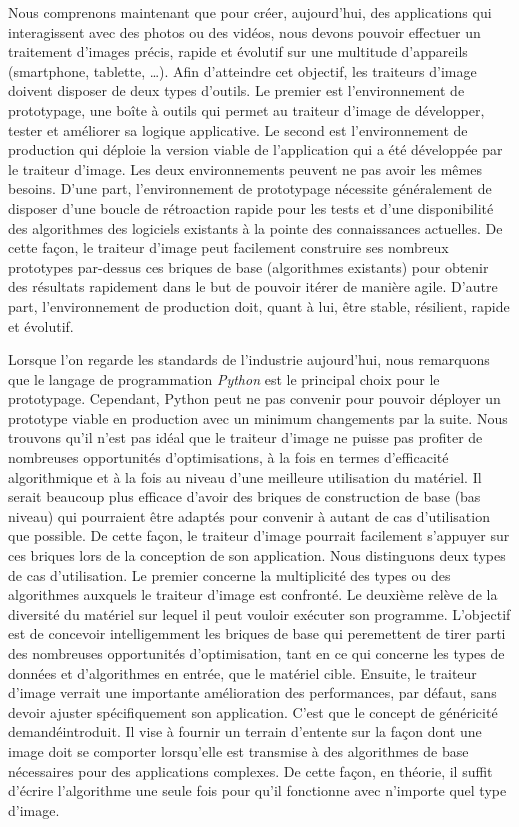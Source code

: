 Nous comprenons maintenant que pour créer, aujourd'hui, des applications qui interagissent avec des photos ou des
vidéos, nous devons pouvoir effectuer un traitement d'images précis, rapide et évolutif sur une multitude d'appareils
(smartphone, tablette, \ldots). Afin d'atteindre cet objectif, les traiteurs d'image doivent disposer de deux types
d'outils. Le premier est l'environnement de prototypage, une boîte à outils qui permet au traiteur d'image de
développer, tester et améliorer sa logique applicative. Le second est l'environnement de production qui déploie la
version viable de l'application qui a été développée par le traiteur d'image. Les deux environnements peuvent ne pas
avoir les mêmes besoins. D'une part, l'environnement de prototypage nécessite généralement de disposer d'une boucle de
rétroaction rapide pour les tests et d'une disponibilité des algorithmes des logiciels existants à la pointe des
connaissances actuelles. De cette façon, le traiteur d'image peut facilement construire ses nombreux prototypes
par-dessus ces briques de base (algorithmes existants) pour obtenir des résultats rapidement dans le but de pouvoir
itérer de manière agile. D'autre part, l'environnement de production doit, quant à lui, être stable, résilient, rapide
et évolutif.

Lorsque l'on regarde les standards de l'industrie aujourd'hui, nous remarquons que le langage de programmation
\emph{Python} est le principal choix pour le prototypage. Cependant, Python peut ne pas convenir pour pouvoir déployer
un prototype viable en production avec un minimum changements par la suite. Nous trouvons qu'il n'est pas idéal que le
traiteur d'image ne puisse pas profiter de nombreuses opportunités d'optimisations, à la fois en termes d'efficacité
algorithmique et à la fois au niveau d'une meilleure utilisation du matériel. Il serait beaucoup plus efficace d'avoir
des briques de construction de base (bas niveau) qui pourraient être adaptés pour convenir à autant de cas d'utilisation
que possible. De cette façon, le traiteur d'image pourrait facilement s'appuyer sur ces briques lors de la conception de
son application. Nous distinguons deux types de cas d'utilisation. Le premier concerne la multiplicité des types ou des
algorithmes auxquels le traiteur d'image est confronté. Le deuxième relève de la diversité du matériel sur lequel il
peut vouloir exécuter son programme. L'objectif est de concevoir intelligemment les briques de base qui peremettent de
tirer parti des nombreuses opportunités d'optimisation, tant en ce qui concerne les types de données et d'algorithmes en
entrée, que le matériel cible. Ensuite, le traiteur d'image verrait une importante amélioration des performances, par
défaut, sans devoir ajuster spécifiquement son application. C'est que le concept de généricité demandéintroduit. Il
vise à fournir un terrain d'entente sur la façon dont une image doit se comporter lorsqu'elle est transmise à des
algorithmes de base nécessaires pour des applications complexes. De cette façon, en théorie, il suffit d'écrire
l'algorithme une seule fois pour qu'il fonctionne avec n'importe quel type d'image.

